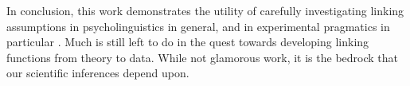 \documentclass[10pt,letterpaper]{article}
\begin{document}
In conclusion, this work demonstrates the utility of carefully investigating linking assumptions in psycholinguistics in general, and in experimental pragmatics in particular \cite<see also>{franke2016link,WaldonDegen2020}. Much is still left to do in the quest towards developing linking functions from theory to data. While not glamorous work, it is the bedrock that our scientific inferences depend upon.

%
		


\end{document}
